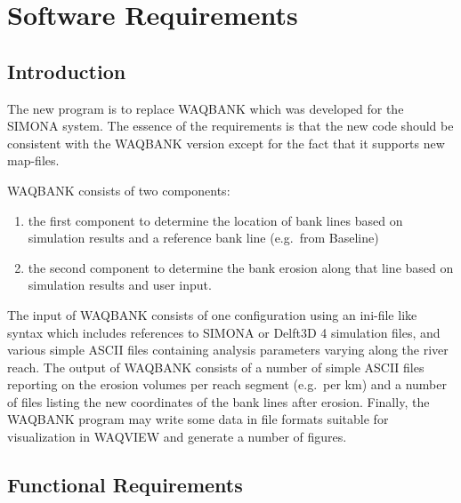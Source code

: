 \chapter{Software Requirements}

\section{Introduction}

The new program is to replace WAQBANK which was developed for the SIMONA system.
The essence of the requirements is that the new code should be consistent with the WAQBANK version except for the fact that it supports new \dflowfm map-files.

WAQBANK consists of two components:

\begin{enumerate}
\item the first component to determine the location of bank lines based on simulation results and a reference bank line (e.g.~from Baseline)
\item the second component to determine the bank erosion along that line based on simulation results and user input.
\end{enumerate}

The input of WAQBANK consists of one configuration using an ini-file like syntax which includes references to SIMONA or Delft3D 4 simulation files, and various simple ASCII files containing analysis parameters varying along the river reach.
The output of WAQBANK consists of a number of simple ASCII files reporting on the erosion volumes per reach segment (e.g.~per km) and a number of files listing the new coordinates of the bank lines after erosion.
Finally, the WAQBANK program may write some data in file formats suitable for visualization in WAQVIEW and generate a number of figures.

\section{Functional Requirements} \label{Sec:FuncReq}

